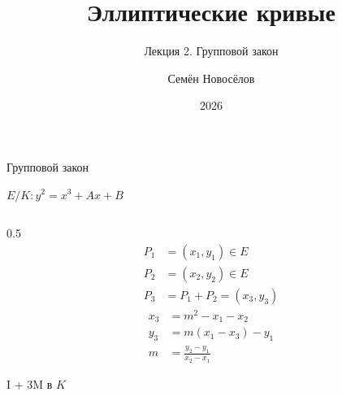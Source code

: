 \documentclass{beamer}
\title{Эллиптические кривые}
\subtitle{Лекция 2. Групповой закон}
\author{Семён Новосёлов}
\institute{БФУ им. И. Канта}
\date{2026}
\begin{document}
	
	\frame{\titlepage}
	
	\begin{frame}{Групповой закон}%
		\begin{center}
			$E/K: y^2 = x^3 + Ax + B$
		\end{center}
		\begin{columns}
			\begin{column}{0.5\textwidth}
				\begin{equation*}
					\begin{split}
						P_1 &= (x_1, y_1) \in E \\
						P_2 &= (x_2, y_2) \in E \\
						P_3 &= P_1 + P_2 = \left(x_3, y_3\right)
					\end{split}
				\end{equation*}
				\begin{equation*}
					\begin{split}
						x_3 &= m^2 - x_1 - x_2 \\
						y_3 &= m\left( x_1 - x_3 \right) - y_1 \\
						m &= \frac{y_2 - y_1}{x_2 - x_1}
					\end{split}
				\end{equation*}
				\begin{center}
					\begin{tcolorbox}[enhanced,hbox,colback=box-blue-color!15,colframe=box-blue-color,title=Сложность,center title]
						\begin{varwidth}{\textwidth}
							\begin{center}
								I + $3$M в $K$
							\end{center}
						\end{varwidth}
					\end{tcolorbox}	
				\end{center}
				

\end{column}
\end{columns}
\end{frame}
\end{document}

